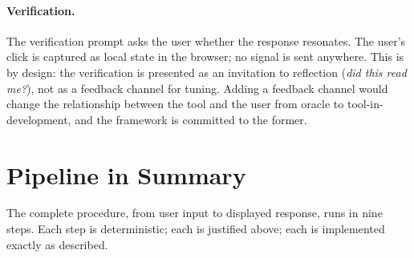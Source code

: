 \documentclass[11pt]{article}
\begin{document}
\paragraph{Verification.}
The verification prompt asks the user whether the response resonates. The user's click is captured as local state in the browser; no signal is sent anywhere. This is by design: the verification is presented as an invitation to reflection (\emph{did this read me?}), not as a feedback channel for tuning. Adding a feedback channel would change the relationship between the tool and the user from oracle to tool-in-development, and the framework is committed to the former.

\section{Pipeline in Summary}

The complete procedure, from user input to displayed response, runs in nine steps. Each step is deterministic; each is justified above; each is implemented exactly as described.
\end{document}
